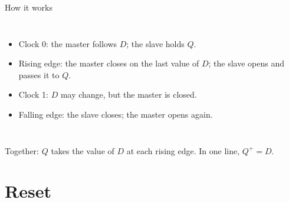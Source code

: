 \documentclass[10pt]{wosm-slides}
\newcommand*\clockedges[1]{\foreach \t in {2,6,10,14} {\timingedge{\t}{#1}}}
\begin{document}
\begin{frame}{How it works}
  \begin{columns}[c, totalwidth=\textwidth]
      \centering
      \small
      \begin{itemize}
        \item Clock 0: the master follows $D$; the slave holds $Q$.
        \item Rising edge: the master closes on the last value of $D$; the slave opens
          and passes it to $Q$.
        \item Clock 1: $D$ may change, but the master is closed.
        \item Falling edge: the slave closes; the master opens again.
      \end{itemize}
  \end{columns}

  \bigskip
  Together: $Q$ takes the value of $D$ at each rising edge. In one line,
  $Q^{+} = D$.
\end{frame}

\section{Reset}
\end{document}
